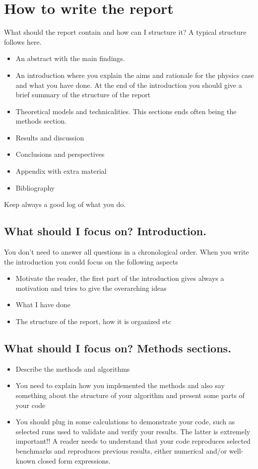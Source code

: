 \documentclass[10pt]{article}
\begin{document}
\section*{How to write the report}
What should the report contain and how can I structure it? A typical structure follows here.
\begin{itemize}
\item An abstract with the main findings.
\item  An introduction where you explain the aims and rationale for the physics case and what you have done. At the end of the introduction you should give a brief summary of the structure of the report
\item Theoretical models and technicalities. This sections ends often being the methods section.
\item Results and discussion
\item Conclusions and perspectives
\item Appendix with extra material
\item Bibliography
\end{itemize}
Keep always a good log of what you do.

\subsection*{What should I focus on? Introduction.}
You don't need to answer all questions in a chronological order. When you write the introduction you could focus on the following aspects
\begin{itemize}
\item Motivate the reader, the first part of the introduction gives always a motivation and tries to give the overarching ideas
\item What I have done
\item The structure of the report, how it is organized etc
\end{itemize}
\subsection*{What should I focus on? Methods sections.}
\begin{itemize}
\item Describe the methods and algorithms
\item You need to explain how you implemented the methods and also say something about the structure of your algorithm and present some parts of your code
\item You should plug in some calculations to demonstrate your code, such as selected runs used to validate and verify your results. The latter is extremely important!! A reader needs to understand that your code reproduces selected benchmarks and reproduces previous results, either numerical and/or well-known closed form expressions.
\end{itemize}
\end{document}
